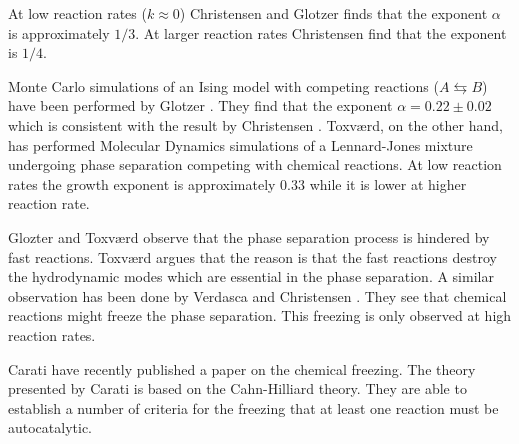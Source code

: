 At low reaction rates ($k \approx 0$) Christensen \etal and Glotzer
\etal finds that the exponent $\alpha$ is approximately $1/3$. At
larger reaction rates Christensen \etal find that the exponent is
$1/4$.

Monte Carlo simulations of an Ising model with competing reactions ($A
\leftrightarrows B$) have been performed by Glotzer \etal
\cite{Glotzer94}. They find that the exponent $\alpha = 0.22 \pm 0.02$
which is consistent with the result by Christensen \etal. Toxv{\ae}rd,
on the other hand, has performed Molecular Dynamics simulations of a
Lennard-Jones mixture undergoing phase separation competing with
chemical reactions. At low reaction rates the growth exponent is
approximately $0.33$ while it is lower at higher reaction rate.

Glozter \etal and Toxv{\ae}rd observe that the phase separation process
is hindered by fast reactions. Toxv{\ae}rd argues that the reason is
that the fast reactions destroy the hydrodynamic modes which are
essential in the phase separation. A similar observation has been done
by Verdasca \etal \cite{Verdasca95} and Christensen \etal
\cite{Christensen96}. They see that chemical reactions might freeze
the phase separation. This freezing is only observed at high reaction
rates.

Carati \etal \cite{Carati97} have recently published a paper on the
chemical freezing. The theory presented by Carati \etal is based on the
Cahn-Hilliard theory. They are able to establish a number of criteria
for the freezing \eg that at least one reaction must be autocatalytic.
